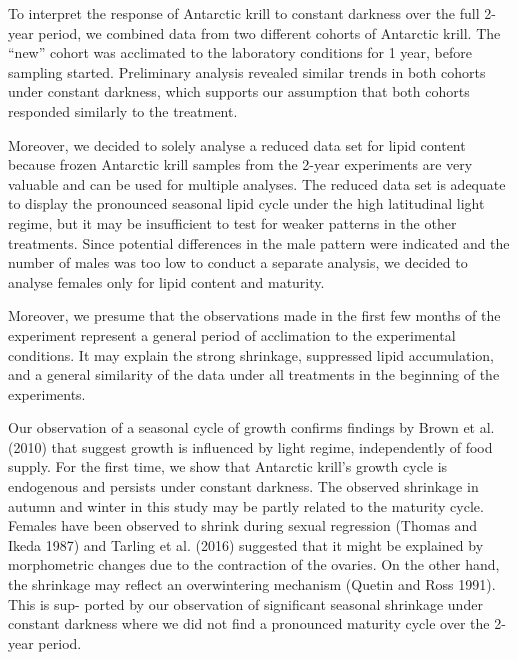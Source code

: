 To interpret the response of Antarctic krill to constant darkness over the full
2-year period, we combined data from two different cohorts of Antarctic krill.
The “new” cohort was acclimated to the laboratory conditions for 1 year, before
sampling started. Preliminary analysis revealed similar trends in both cohorts
under constant darkness, which supports our assumption that both cohorts
responded similarly to the treatment. 

Moreover, we decided to solely analyse a reduced data set for lipid content
because frozen Antarctic krill samples from the 2-year experiments are very
valuable and can be used for multiple analyses. The reduced data set is
adequate to display the pronounced seasonal lipid cycle under the high
latitudinal light regime, but it may be insufficient to test for weaker
patterns in the other treatments. Since potential differences in the male
pattern were indicated and the number of males was too low to conduct a
separate analysis, we decided to analyse females only for lipid content and
maturity. 

Moreover, we presume that the observations made in the first few months of the
experiment represent a general period of acclimation to the experimental
conditions. It may explain the strong shrinkage, suppressed lipid accumulation,
and a general similarity of the data under all treatments in the beginning of
the experiments. 

Our observation of a seasonal cycle of growth confirms findings by Brown et al.
(2010) that suggest growth is influenced by light regime, independently of food
supply. For the first time, we show that Antarctic krill’s growth cycle is
endogenous and persists under constant darkness. The observed shrinkage in
autumn and winter in this study may be partly related to the maturity cycle.
Females have been observed to shrink during sexual regression (Thomas and Ikeda
1987) and Tarling et al. (2016) suggested that it might be explained by
morphometric changes due to the contraction of the ovaries. On the other hand,
the shrinkage may reflect an overwintering mechanism (Quetin and Ross 1991).
This is sup- ported by our observation of significant seasonal shrinkage under
constant darkness where we did not find a pronounced maturity cycle over the
2-year period. 


